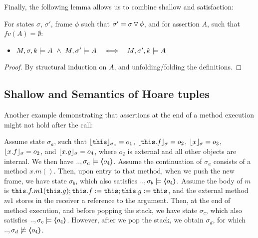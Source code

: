  
 
Finally, the following lemma allows us to combine shallow and \scoped satisfaction:

\begin{lemma}
\label{l:shallow:scoped:scoped}
For states  $\sigma$,  $\sigma'$, frame $\phi$ such that $\sigma'=\sigma  \pushSymbol \phi$, and for  
assertion $A$, such that $fv(A)=\emptyset$:
\begin{itemize}
\item
$\satDAssertFrom M  \sigma k A\   \wedge \ M, \sigma' \models A \ \ \ \Longleftrightarrow \ \ \   \satDAssertFrom M  {\sigma'} k  A$ 
\end{itemize}
\end{lemma}

\begin{proof}
By structural induction on $A$, and unfolding/folding the definitions.
\end{proof}




\subsection{Shallow and \Scoped Semantics of Hoare tuples}

Another example demonstrating that assertions at the end of a method execution might not hold after the call:

\begin{example}
\label{ex:motivate:scopes}
Assume state $\sigma_a$, such that $\interpret {\sigma_a} {\prg{this}}=o_1$, $\interpret {\sigma} {\prg{this}.f}=o_2$, $\interpret {\sigma} {x}=o_3$, $\interpret {\sigma} {x.f}=o_2$,  
and $\interpret {\sigma} {x.g}=o_4$, where $o_2$ is external and all other objects are internal. 
We then have $..,\sigma_a \models  \inside {o_4}$.
Assume %
 the continuation of $\sigma_a$   consists of a method $x.m()$. Then,
upon entry to that method, when we push the new frame, we have  state $\sigma_b$, which also satisfies $..,\sigma_b \models  \inside {o_4}$.
Assume %
 the   body of $m$ is $\prg{this}.f.m1(\prg{this}.g); \prg{this}.f := \prg{this};  \prg{this}.g := \prg{this}$, and %
 the external method $m1$ stores in the 
receiver a reference to the argument.
Then, at the end of method execution, and before popping the stack, we have   state $\sigma_c$, which also satisfies $..,\sigma_c \models  \inside {o_4}$.
However, after we pop the stack, we obtain $\sigma_d$, for which $..,\sigma_d \not\models  \inside {o_4}$.
\end{example} 


